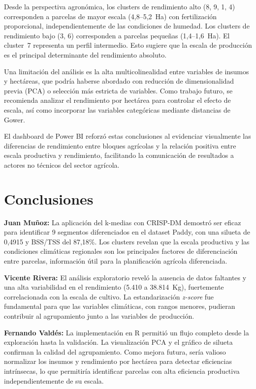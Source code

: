 \documentclass[10pt,a4paper]{article}
\begin{document}
Desde la perspectiva agronómica, los clusters de rendimiento alto (8, 9, 1, 4) corresponden a parcelas de mayor escala (4,8--5,2~Ha) con fertilización proporcional, independientemente de las condiciones de humedad. Los clusters de rendimiento bajo (3, 6) corresponden a parcelas pequeñas (1,4--1,6~Ha). El cluster~7 representa un perfil intermedio. Esto sugiere que la escala de producción es el principal determinante del rendimiento absoluto.

Una limitación del análisis es la alta multicolinealidad entre variables de insumos y hectáreas, que podría haberse abordado con reducción de dimensionalidad previa (PCA) o selección más estricta de variables. Como trabajo futuro, se recomienda analizar el rendimiento por hectárea para controlar el efecto de escala, así como incorporar las variables categóricas mediante distancias de Gower.

El dashboard de Power BI reforzó estas conclusiones al evidenciar visualmente las diferencias de rendimiento entre bloques agrícolas y la relación positiva entre escala productiva y rendimiento, facilitando la comunicación de resultados a actores no técnicos del sector agrícola.

\section{Conclusiones}

\textbf{Juan Muñoz:} La aplicación del k-medias con CRISP-DM demostró ser eficaz para identificar 9 segmentos diferenciados en el dataset Paddy, con una silueta de 0,4915 y BSS/TSS del 87,18\%. Los clusters revelan que la escala productiva y las condiciones climáticas regionales son los principales factores de diferenciación entre parcelas, información útil para la planificación agrícola diferenciada.

\textbf{Vicente Rivera:} El análisis exploratorio reveló la ausencia de datos faltantes y una alta variabilidad en el rendimiento (5.410 a 38.814~Kg), fuertemente correlacionada con la escala de cultivo. La estandarización \textit{z-score} fue fundamental para que las variables climáticas, con rangos menores, pudieran contribuir al agrupamiento junto a las variables de producción.

\textbf{Fernando Valdés:} La implementación en R \parencite{rcore2024} permitió un flujo completo desde la exploración hasta la validación. La visualización PCA y el gráfico de silueta confirman la calidad del agrupamiento. Como mejora futura, sería valioso normalizar los insumos y rendimiento por hectárea para detectar eficiencias intrínsecas, lo que permitiría identificar parcelas con alta eficiencia productiva independientemente de su escala.
\end{document}
